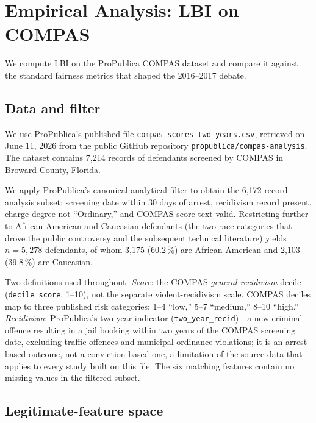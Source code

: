 \documentclass[11pt]{article}
\begin{document}
\section{Empirical Analysis: LBI on COMPAS}
\label{sec:empirical}

We compute LBI on the ProPublica COMPAS dataset and compare it
against the standard fairness metrics that shaped the 2016--2017
debate.

\subsection{Data and filter}

We use ProPublica's published file
\verb|compas-scores-two-years.csv|, retrieved on June 11, 2026 from
the public GitHub repository \verb|propublica/compas-analysis|. The
dataset contains 7,214 records of defendants screened by COMPAS in
Broward County, Florida.

We apply ProPublica's canonical analytical filter to obtain the
6,172-record analysis subset: screening date within 30 days of arrest,
recidivism record present, charge degree not ``Ordinary,'' and COMPAS
score text valid. Restricting further to African-American and
Caucasian defendants (the two race categories that drove the public
controversy and the subsequent technical literature) yields $n =
5{,}278$ defendants, of whom 3,175 (60.2\,\%) are African-American
and 2,103 (39.8\,\%) are Caucasian.

Two definitions used throughout. \emph{Score}: the COMPAS
\emph{general recidivism} decile (\verb|decile_score|, 1--10), not
the separate violent-recidivism scale. COMPAS deciles map to three
published risk categories: 1--4 ``low,'' 5--7 ``medium,'' 8--10
``high.'' \emph{Recidivism}: ProPublica's two-year indicator
(\verb|two_year_recid|)---a new criminal offence resulting in a jail
booking within two years of the COMPAS screening date, excluding
traffic offences and municipal-ordinance violations; it is an
arrest-based outcome, not a conviction-based one, a limitation of
the source data that applies to every study built on this file. The
six matching features contain no missing values in the filtered
subset.

\subsection{Legitimate-feature space}
\end{document}
